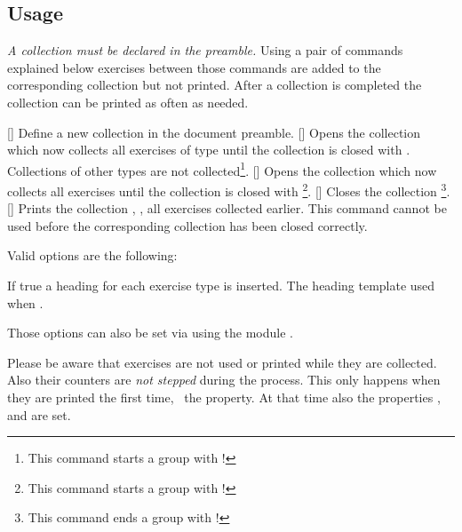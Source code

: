 \documentclass{xsim-manual}
\begin{document}
\subsection{Usage}
\emph{A collection must be declared in the preamble.}  Using a pair of
commands explained below exercises between those commands are added to the
corresponding collection but not printed.  After a collection is completed the
collection can be printed as often as needed.
\begin{commands}
  []
    Define a new collection  in the document preamble.
  []
    Opens the collection  which now collects all
    exercises of type  until the collection is closed with
    .  Collections of other types are not
    collected\footnote{This command starts a group with
      !}.
  []
    Opens the collection  which now collects all
    exercises until the collection is closed with
    \footnote{This command starts a group with
      !}.
  []
    Closes the collection \footnote{This command ends
      a group with !}.
  []
    Prints the collection , \ie, all exercises collected
    earlier.  This command cannot be used before the corresponding collection
    has been closed correctly.
\end{commands}

Valid options are the following:
\begin{options}
    If true a heading for each exercise type is inserted.
    The heading template used when .
\end{options}

Those options can also be set via  using the module
.

\begin{bewareofthedog}
  Please be aware that exercises are not used or printed while they are
  collected.  Also their counters are \emph{not stepped} during the process.
  This only happens when they are printed the first time, \cf\ the
   property.  At that time also the properties ,
   and  are set.
\end{bewareofthedog}
\end{document}
